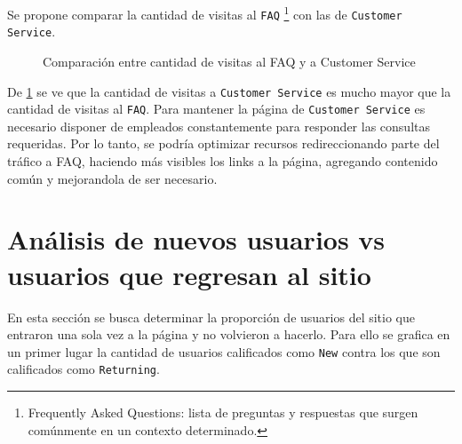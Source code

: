 \documentclass[a4paper]{article}
\begin{document}
Se propone comparar la cantidad de visitas al \texttt{FAQ} \footnote{Frequently Asked Questions: lista de preguntas y respuestas que surgen comúnmente en un contexto determinado.} con las de \texttt{Customer Service}.

\begin{figure}[h!]
	\caption{Comparación entre cantidad de visitas al FAQ y a Customer Service}
	\label{fig:staticpage}
\end{figure}

De \ref{fig:staticpage} se ve que la cantidad de visitas a \texttt{Customer Service} es mucho mayor que la cantidad de visitas al \texttt{FAQ}. Para mantener la página de \texttt{Customer Service} es necesario disponer de empleados constantemente para responder las consultas requeridas. Por lo tanto, se podría optimizar recursos redireccionando parte del tráfico a FAQ, haciendo más visibles los links a la página, agregando contenido común y mejorandola de ser necesario.

\section{Análisis de nuevos usuarios vs usuarios que regresan al sitio}

En esta sección se busca determinar la proporción de usuarios del sitio que entraron una sola vez a la página y no volvieron a hacerlo. Para ello se grafica en un primer lugar la cantidad de usuarios calificados como \texttt{New} contra los que son calificados como \texttt{Returning}.
\end{document}
